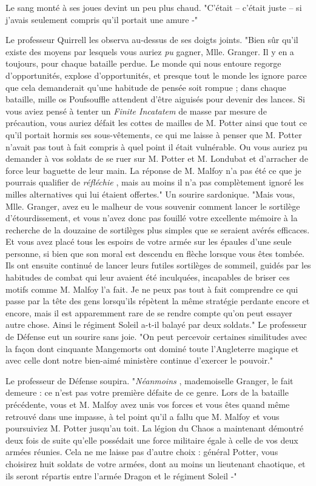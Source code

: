 Le sang monté à ses joues devint un peu plus chaud. "C'était – c'était juste – si j'avais seulement compris qu'il portait une amure -"

Le professeur Quirrell les observa au-dessus de ses doigts joints. "Bien sûr qu'il existe des moyens par lesquels vous auriez \emph{pu}  gagner, Mlle. Granger. Il y en a toujours, pour chaque bataille perdue. Le monde qui nous entoure regorge d'opportunités, explose d'opportunités, et presque tout le monde les ignore parce que cela demanderait qu'une habitude de pensée soit rompue ; dans chaque bataille, mille os Poufsouffle attendent d'être aiguisés pour devenir des lances. Si vous aviez pensé à tenter un \emph{Finite Incatatem}  de masse par mesure de précaution, vous auriez défait les cottes de mailles de M. Potter ainsi que tout ce qu'il portait hormis ses sous-vêtements, ce qui me laisse à penser que M. Potter n'avait pas tout à fait compris à quel point il était vulnérable. Ou vous auriez pu demander à vos soldats de se ruer sur M. Potter et M. Londubat et d'arracher de force leur baguette de leur main. La réponse de M. Malfoy n'a pas été ce que je pourrais qualifier de \emph{réfléchie} , mais au moins il n'a pas complètement ignoré les milles alternatives qui lui étaient offertes." Un sourire sardonique. "Mais vous, Mlle. Granger, avez eu le malheur de vous souvenir comment lancer le sortilège d'étourdissement, et vous n'avez donc pas fouillé votre excellente mémoire à la recherche de la douzaine de sortilèges plus simples que se seraient avérés efficaces. Et vous avez placé tous les espoirs de votre armée sur les épaules d'une seule personne, si bien que son moral est descendu en flèche lorsque vous êtes tombée. Ils ont ensuite continué de lancer leurs futiles sortilèges de sommeil, guidés par les habitudes de combat qui leur avaient été inculquées, incapables de briser ces motifs comme M. Malfoy l'a fait. Je ne peux pas tout à fait comprendre ce qui passe par la tête des gens lorsqu'ils répètent la même stratégie perdante encore et encore, mais il est apparemment rare de se rendre compte qu'on peut essayer autre chose. Ainsi le régiment Soleil a-t-il balayé par deux soldats." Le professeur de Défense eut un sourire sans joie. "On peut percevoir certaines similitudes avec la façon dont cinquante Mangemorts ont dominé toute l'Angleterre magique et avec celle dont notre bien-aimé ministère continue d'exercer le pouvoir."

Le professeur de Défense soupira. "\emph{Néanmoins} , mademoiselle Granger, le fait demeure : ce n'est pas votre première défaite de ce genre. Lors de la bataille précédente, vous et M. Malfoy avez unis vos forces et vous êtes quand même retrouvé dans une impasse, à tel point qu'il a fallu que M. Malfoy et vous poursuiviez M. Potter jusqu'au toit. La légion du Chaos a maintenant démontré deux fois de suite qu'elle possédait une force militaire égale à celle de vos deux armées réunies. Cela ne me laisse pas d'autre choix : général Potter, vous choisirez huit soldats de votre armées, dont au moins un lieutenant chaotique, et ils seront répartis entre l'armée Dragon et le régiment Soleil -"

